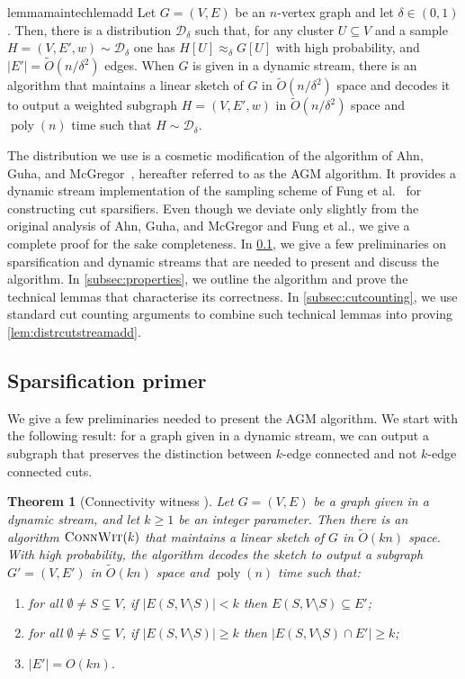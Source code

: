 \documentclass[epsfig,letter,11pt]{article}
\numberwithin{equation}{section}
\newcommand{\otil}{\tilde{O}}
\renewcommand{\tilde}{\widetilde}
\DeclareMathOperator*{\poly}{poly}
\newtheorem{theorem}{Theorem}[section]
\begin{document}
\begin{restatable}{lemma}{maintechlemadd}
	\label{lem:distrcutstreamadd}
	Let $G=(V,E)$ be an $n$-vertex graph and let $\delta \in (0,1)$. Then, there is a distribution $\mathcal{D}_\delta$ such that, for any cluster $U \subseteq V$ and a sample $H=(V,E',w)  \sim \mathcal{D}_\delta$ one has $H[U] \approx_\delta G[U]$ with high probability, and $|E'| = \otil(n/\delta^2)$ edges. When $G$ is given in a dynamic stream, there is an algorithm that maintains a linear sketch of $G$ in $\otil(n/\delta^2)$ space and decodes it to output a weighted subgraph $H=(V,E',w)$  in $\otil(n/\delta^2)$ space and $\poly(n)$ time such that $H \sim  \mathcal{D}_\delta$.
\end{restatable}
\noindent
The distribution  we use is a cosmetic modification of the algorithm of Ahn, Guha, and McGregor~\cite{sparsdynamicstreams}, hereafter referred to as the AGM algorithm. It provides a dynamic stream implementation of the sampling scheme of Fung et al.~\cite{fungspars} for constructing cut sparsifiers. Even though we deviate only slightly from the original analysis of Ahn, Guha, and McGregor and Fung et al., we give a complete proof for the sake completeness. In \cref{subsec:primer}, we give a few preliminaries on sparsification and dynamic streams that are needed to present and discuss the algorithm. In \cref{subsec:properties}, we outline the algorithm and prove the technical lemmas that characterise its correctness. In \cref{subsec:cutcounting}, we use standard cut counting arguments to combine such technical lemmas into proving \cref{lem:distrcutstreamadd}.

\subsection{Sparsification primer}
\label{subsec:primer}
We give a few preliminaries needed to present the AGM algorithm. We start with the following result: for a graph given in a dynamic stream, we can output a subgraph that preserves the distinction between $k$-edge connected and not $k$-edge connected cuts.

\begin{theorem}[Connectivity witness \cite{linmeas}]
	\label{th:connwit}
	Let $G=(V,E)$ be a graph given in a dynamic stream, and let $k \ge 1$ be an integer parameter. Then there is an algorithm $\textsc{ConnWit}(k)$ that maintains a linear sketch of $G$ in $\otil(kn)$ space. With high probability, the algorithm decodes the sketch to output a subgraph $G'=(V,E')$ in $\otil(kn)$ space and $\poly(n)$ time such that:
	\begin{enumerate}
		\item for all $\emptyset \neq S \subsetneq V$, if $|E(S,V\setminus S)| < k$ then $E(S, V \setminus S) \subseteq E'$;
		\item for all $\emptyset \neq S \subsetneq V$, if $|E(S,V\setminus S)| \ge k$ then $|E(S, V \setminus S) \cap E'|\ge k$;
		\item $|E'|=O(kn)$.
	\end{enumerate}
\end{theorem}
\end{document}
